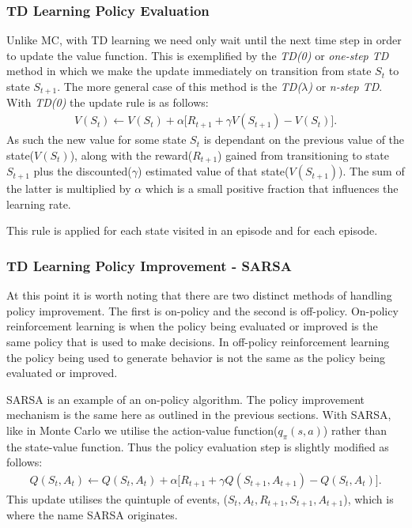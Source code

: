 \subsubsection{TD Learning Policy Evaluation}
Unlike MC, with TD learning we need only wait until the next time step in order to update the value function.
This is exemplified by the \textit{TD(0)} or \textit{one-step TD} method in which we make the
update immediately on transition from state $S_t$ to state $S_{t+1}$.
The more general case of this method is the \textit{TD($\lambda$)} or \textit{n-step TD}.
With \textit{TD(0)} the update rule is as follows:
\begin{align}
    V(S_t) \leftarrow V(S_t) + \alpha \lbrack R_{t+1} + \gamma V(S_{t+1}) - V(S_t) \rbrack.
\end{align}
As such the new value for some state $S_t$ is dependant on the previous value of the state($V(S_t)$),
along with the reward($R_{t+1}$) gained from transitioning to state $S_{t+1}$ plus the discounted($\gamma$)
estimated value of that state($V(S_{t+1})$).
The sum of the latter is multiplied by $\alpha$ which is a small positive fraction that influences the
learning rate.

This rule is applied for each state visited in an episode and for each episode.

\subsubsection{TD Learning Policy Improvement - SARSA}
At this point it is worth noting that there are two distinct methods of handling policy improvement.
The first is on-policy and the second is off-policy.
On-policy reinforcement learning is when the policy being evaluated or improved is the same policy that is used
to make decisions.
In off-policy reinforcement learning the policy being used to generate behavior is not the same as the policy
being evaluated or improved.

SARSA is an example of an on-policy algorithm.
The policy improvement mechanism is the same here as outlined in the previous sections.
With SARSA, like in Monte Carlo we utilise the action-value function($q_{\pi}(s, a)$) rather
than the state-value function.
Thus the policy evaluation step is slightly modified as follows:
\begin{align}
    Q(S_t, A_t) \leftarrow Q(S_t, A_t) + \alpha \lbrack R_{t+1} + \gamma Q(S_{t+1}, A_{t+1}) - Q(S_t, A_t) \rbrack.
\end{align}
This update utilises the quintuple of events, ($S_t, A_t, R_{t+1}, S_{t+1}, A_{t+1}$), which is where the
name SARSA originates.


